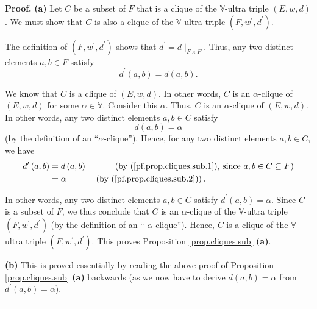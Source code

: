 \documentclass[numbers=enddot,12pt,final,onecolumn,notitlepage]{scrartcl}%
\theoremstyle{definition}
\newenvironment{proof}[1][Proof]{\noindent\textbf{#1.} }{\ \rule{0.5em}{0.5em}}
\newcommand{\timesu}{\mathbin{\underline{\times}}}
\theoremstyle{plainsl}
\begin{document}
\begin{proof}
\textbf{(a)} Let $C$ be a subset of $F$ that is a clique of the $\mathbb{V}%
$-ultra triple $\left(  E,w,d\right)  $. We must show that $C$ is also a
clique of the $\mathbb{V}$-ultra triple $\left(  F,w^{\prime},d^{\prime
}\right)  $.

The definition of $\left(  F,w^{\prime},d^{\prime}\right)  $ shows that
$d^{\prime}=d\mid_{F\timesu F}$. Thus, any two distinct elements $a,b\in F$
satisfy%
\begin{equation}
d^{\prime}\left(  a,b\right)  =d\left(  a,b\right)  .
\label{pf.prop.cliques.sub.1}%
\end{equation}


We know that $C$ is a clique of $\left(  E,w,d\right)  $. In other words, $C$
is an $\alpha$-clique of $\left(  E,w,d\right)  $ for some $\alpha
\in\mathbb{V}$. Consider this $\alpha$. Thus, $C$ is an $\alpha$-clique of
$\left(  E,w,d\right)  $. In other words, any two distinct elements $a,b\in C$
satisfy
\begin{equation}
d\left(  a,b\right)  =\alpha\label{pf.prop.cliques.sub.2}%
\end{equation}
(by the definition of an \textquotedblleft$\alpha$-clique\textquotedblright).
Hence, for any two distinct elements $a,b\in C$, we have%
\begin{align*}
d^{\prime}\left(  a,b\right)   &  =d\left(  a,b\right)
\ \ \ \ \ \ \ \ \ \ \left(  \text{by (\ref{pf.prop.cliques.sub.1}), since
}a,b\in C\subseteq F\right) \\
&  =\alpha\ \ \ \ \ \ \ \ \ \ \left(  \text{by (\ref{pf.prop.cliques.sub.2}%
)}\right)  .
\end{align*}


In other words, any two distinct elements $a,b\in C$ satisfy $d^{\prime
}\left(  a,b\right)  =\alpha$. Since $C$ is a subset of $F$, we thus conclude
that $C$ is an $\alpha$-clique of the $\mathbb{V}$-ultra triple $\left(
F,w^{\prime},d^{\prime}\right)  $ (by the definition of an \textquotedblleft%
$\alpha$-clique\textquotedblright). Hence, $C$ is a clique of the $\mathbb{V}%
$-ultra triple $\left(  F,w^{\prime},d^{\prime}\right)  $. This proves
Proposition \ref{prop.cliques.sub} \textbf{(a)}. \medskip

\textbf{(b)} This is proved essentially by reading the above proof of
Proposition \ref{prop.cliques.sub} \textbf{(a)} backwards (as we now have to
derive $d\left(  a,b\right)  =\alpha$ from $d^{\prime}\left(  a,b\right)
=\alpha$).
\end{proof}
\end{document}
